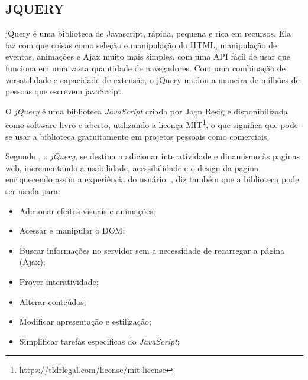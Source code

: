 \subsection{JQUERY}

\begin{citacao}
    jQuery é uma biblioteca de Javascript, rápida, pequena e rica em recursos. Ela faz com que coisas como seleção e manipulação do HTML, manipulação de eventos, animações e Ajax muito mais simples, com uma API fácil de usar que funciona em uma vasta quantidade de navegadores. Com uma combinação de versatilidade e capacidade de extensão, o jQuery mudou a maneira de milhões de pessoas que escrevem javaScript. \cite[tradução nossa]{jquery}
\end{citacao}

O \textit{jQuery} é uma biblioteca \textit{JavaScript} criada por Jogn Resig e disponibilizada como software livro e aberto, utilizando a licença \ac{MIT}\footnote{\url{https://tldrlegal.com/license/mit-license}}, o que significa que pode-se usar a biblioteca gratuitamente em projetos pessoais como comerciais.

Segundo \cite[p.~4]{silva-jquery}, o \textit{jQuery}, se destina a adicionar interatividade e dinamismo às paginas web, incrementando a usabilidade, acessibilidade e o design da pagina, enriquecendo assim a experiência do usuário. , diz também que a biblioteca pode ser usada para:
\begin{itemize}
    \item Adicionar efeitos visuais e animações;
    \item Acessar e manipular o DOM;
    \item Buscar informações no servidor sem a necessidade de recarregar a página (Ajax);
    \item Prover interatividade;
    \item Alterar conteúdos;
    \item Modificar apresentação e estilização;
    \item Simplificar tarefas especificas do \textit{JavaScript};
\end{itemize}

